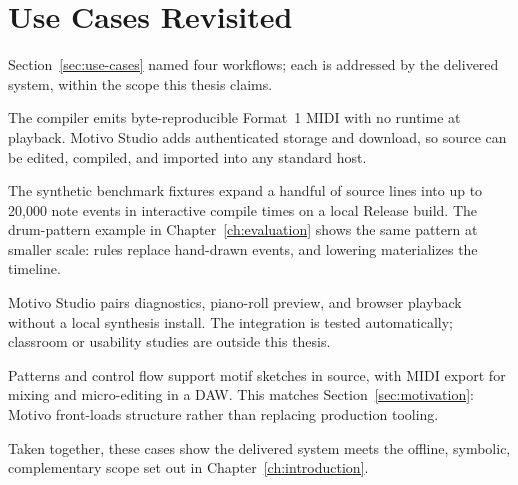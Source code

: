 \section{Use Cases Revisited}\label{sec:use-cases-revisited}

Section~\ref{sec:use-cases} named four workflows; each is addressed by the delivered system, within the scope this
thesis claims.

The compiler emits byte-reproducible Format~1 MIDI with no runtime at playback.
Motivo Studio adds authenticated storage and download, so source can be edited, compiled, and imported into any standard
host.

The synthetic benchmark fixtures expand a handful of source lines into up to 20,000 note events in interactive compile
times on a local Release build.
The drum-pattern example in Chapter~\ref{ch:evaluation} shows the same pattern at smaller scale: rules replace
hand-drawn events, and lowering materializes the timeline.

Motivo Studio pairs diagnostics, piano-roll preview, and browser playback without a local synthesis install.
The integration is tested automatically; classroom or usability studies are outside this thesis.

Patterns and control flow support motif sketches in source, with MIDI export for mixing and micro-editing in a DAW.
This matches Section~\ref{sec:motivation}: Motivo front-loads structure rather than replacing production tooling.

Taken together, these cases show the delivered system meets the offline, symbolic, complementary scope set out in
Chapter~\ref{ch:introduction}.
